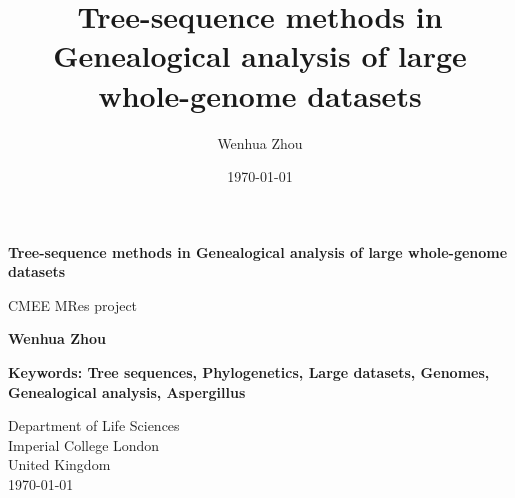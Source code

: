\documentclass[11pt]{article}
\begin{document}
\begin{titlepage}
   \begin{center}
       \vspace*{1cm}
 
       {\huge \textbf{Tree-sequence methods in Genealogical analysis of large whole-genome datasets}}
       
       \vspace{0.5cm}
       
       CMEE MRes project
       
       \vspace{1.5cm}
 
       \textbf{Wenhua Zhou}
       
       \vspace{0.5cm}
       
       
       \vspace{1.5cm}
       
       
       \vspace{0.5cm}
       
       
       
       \vspace{3cm}
       
       \textbf{Keywords: Tree sequences, Phylogenetics, Large datasets, Genomes, Genealogical analysis, Aspergillus}
       \vfill
 
 
       \vspace{0.8cm}
 
 
       Department of Life Sciences\\
       Imperial College London\\
       United Kingdom\\
       \today
 
   \end{center}
\end{titlepage}


\title{Tree-sequence methods in Genealogical analysis of large whole-genome datasets}
\author{Wenhua Zhou}
\date{\today}
\end{document}
